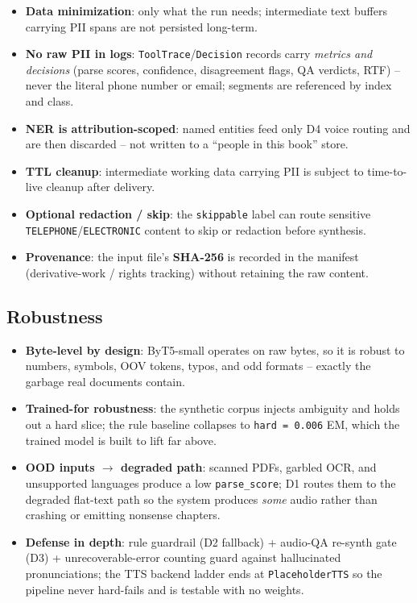 \documentclass[12pt,a4paper]{article}
\begin{document}
\begin{itemize}\setlength\itemsep{0.15em}
  \item \textbf{Data minimization}: only what the run needs; intermediate text buffers carrying PII spans are not persisted long-term.
  \item \textbf{No raw PII in logs}: \texttt{ToolTrace}/\texttt{Decision} records carry \emph{metrics and decisions} (parse scores, confidence, disagreement flags, QA verdicts, RTF) -- never the literal phone number or email; segments are referenced by index and class.
  \item \textbf{NER is attribution-scoped}: named entities feed only D4 voice routing and are then discarded -- not written to a ``people in this book'' store.
  \item \textbf{TTL cleanup}: intermediate working data carrying PII is subject to time-to-live cleanup after delivery.
  \item \textbf{Optional redaction / skip}: the \texttt{skippable} label can route sensitive \texttt{TELEPHONE}/\texttt{ELECTRONIC} content to skip or redaction before synthesis.
  \item \textbf{Provenance}: the input file's \textbf{SHA-256} is recorded in the manifest (derivative-work / rights tracking) without retaining the raw content.
\end{itemize}

\subsection{Robustness}

\begin{itemize}\setlength\itemsep{0.15em}
  \item \textbf{Byte-level by design}: ByT5-small operates on raw bytes, so it is robust to numbers, symbols, OOV tokens, typos, and odd formats -- exactly the garbage real documents contain.
  \item \textbf{Trained-for robustness}: the synthetic corpus injects ambiguity and holds out a hard slice; the rule baseline collapses to \texttt{hard = 0.006} EM, which the trained model is built to lift far above.
  \item \textbf{OOD inputs $\rightarrow$ degraded path}: scanned PDFs, garbled OCR, and unsupported languages produce a low \texttt{parse\_score}; D1 routes them to the degraded flat-text path so the system produces \emph{some} audio rather than crashing or emitting nonsense chapters.
  \item \textbf{Defense in depth}: rule guardrail (D2 fallback) + audio-QA re-synth gate (D3) + unrecoverable-error counting guard against hallucinated pronunciations; the TTS backend ladder ends at \texttt{PlaceholderTTS} so the pipeline never hard-fails and is testable with no weights.
\end{itemize}
\end{document}
